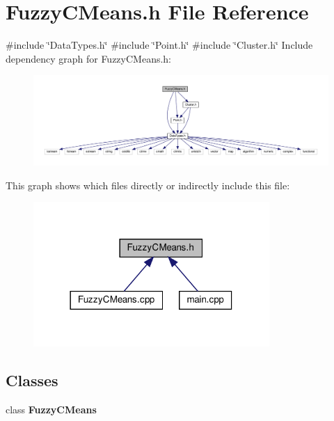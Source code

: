 \section{Fuzzy\+C\+Means.\+h File Reference}
\label{_fuzzy_c_means_8h}
{\ttfamily \#include \char`\"{}Data\+Types.\+h\char`\"{}}\newline
{\ttfamily \#include \char`\"{}Point.\+h\char`\"{}}\newline
{\ttfamily \#include \char`\"{}Cluster.\+h\char`\"{}}\newline
Include dependency graph for Fuzzy\+C\+Means.\+h\+:
\nopagebreak
\begin{figure}[H]
\begin{center}
\leavevmode
\includegraphics[width=350pt]{_fuzzy_c_means_8h__incl}
\end{center}
\end{figure}
This graph shows which files directly or indirectly include this file\+:
\nopagebreak
\begin{figure}[H]
\begin{center}
\leavevmode
\includegraphics[width=254pt]{_fuzzy_c_means_8h__dep__incl}
\end{center}
\end{figure}
\subsection*{Classes}
\begin{DoxyCompactItemize}
\item 
class \textbf{ Fuzzy\+C\+Means}
\end{DoxyCompactItemize}
